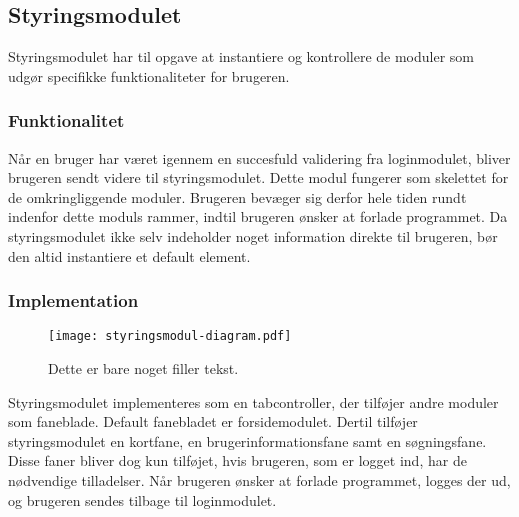 \subsection{Styringsmodulet}
\label{sub:styringsmodul}

Styringsmodulet har til opgave at instantiere og kontrollere de moduler som udgør specifikke funktionaliteter for brugeren.

\subsubsection{Funktionalitet}
\label{ssub:hovedmodul_funktionalitet}

Når en bruger har været igennem en succesfuld validering fra loginmodulet, bliver brugeren sendt videre til styringsmodulet. Dette modul fungerer som skelettet for de omkringliggende moduler. Brugeren bevæger sig derfor hele tiden rundt indenfor dette moduls rammer, indtil brugeren ønsker at forlade programmet. Da styringsmodulet ikke selv indeholder noget information direkte til brugeren, bør den altid instantiere et default element.

\subsubsection{Implementation}
\label{ssub:hovedmodul_implementation}

\begin{figure}
  \centering
  \texttt{[image: styringsmodul-diagram.pdf]}
  \caption{Dette er bare noget filler tekst.}
\end{figure}


Styringsmodulet implementeres som en tabcontroller, der tilføjer andre moduler som faneblade. Default fanebladet er forsidemodulet. Dertil tilføjer styringsmodulet en kortfane, en brugerinformationsfane samt en søgningsfane. Disse faner bliver dog kun tilføjet, hvis brugeren, som er logget ind, har de nødvendige tilladelser. Når brugeren ønsker at forlade programmet, logges der ud, og brugeren sendes tilbage til loginmodulet.

